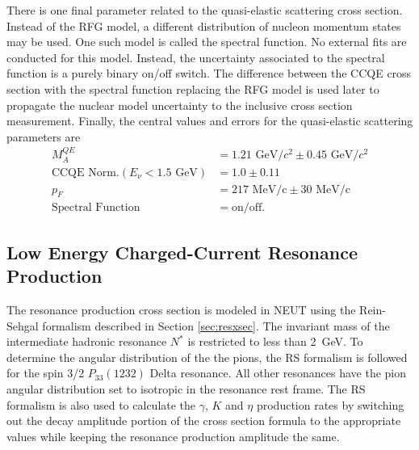 There is one final parameter related to the quasi-elastic scattering cross section. Instead of the RFG model, a different distribution of nucleon momentum states may be used. One such model is called the spectral function\cite{SF}. No external fits are conducted for this model. Instead, the uncertainty associated to the spectral function is a purely binary on/off switch. The difference between the CCQE cross section with the spectral function replacing the RFG model is used later to propagate the nuclear model uncertainty to the inclusive cross section measurement. Finally, the central values and errors for the quasi-elastic scattering parameters are
\begin{align}
M_A^{QE} &= 1.21\text{~GeV/}c^2  \pm 0.45\text{~GeV/}c^2 \\
\text{CCQE Norm.}(E_\nu < 1.5\text{~GeV}) &= 1.0 \pm 0.11 \\
p_F &= 217\text{~MeV/c}\pm30\text{~MeV/c}\\
\text{Spectral Function} &= \text{on/off}.
\end{align}

\subsection{Low Energy Charged-Current Resonance Production}

The resonance production cross section is modeled in NEUT using the Rein-Sehgal\cite{RS1pi} formalism described in Section \ref{sec:resxsec}. The invariant mass of the intermediate hadronic resonance $N^*$ is restricted to less than 2~GeV. To determine the angular distribution of the the pions, the RS formalism is followed for the spin 3/2 $P_{33}(1232)$ Delta resonance. All other resonances have the pion angular distribution set to isotropic in the resonance rest frame. The RS formalism is also used to calculate the $\gamma$, $K$ and $\eta$ production rates by switching out the decay amplitude portion of the cross section formula to the appropriate values while keeping the resonance production amplitude the same.

